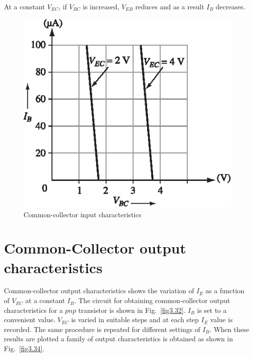 \begin{itemize}
At a constant $V_{EC}$, if $V_{BC}$ is increased, $V_{EB}$ reduces and as a result $I_{B}$ decreases.
\begin{figure}[H]
\centering
\includegraphics[scale=1.05]{chap2/S3-EE-03-033a.eps}
\caption{Common-collector input characteristics}\label{fig3.33}
\end{figure}
\end{itemize}

\section{Common-Collector output characteristics}\label{sec3.24}

Common-collector output characteristics shows the variation of $I_{E}$ as a function of $V_{EC}$ at a constant $I_{B}$. The circuit for obtaining common-collector output characteristics for a $pnp$ transistor is shown in Fig.~\ref{fig3.32}. $I_{B}$ is set to a convenient value. $V_{EC}$ is varied in suitable steps and at each step $I_{E}$ value is recorded. The same procedure is repeated for different settings of $I_{B}$. When these results are plotted a family of output characteristics is obtained as shown in Fig.~\ref{fig3.34}.


